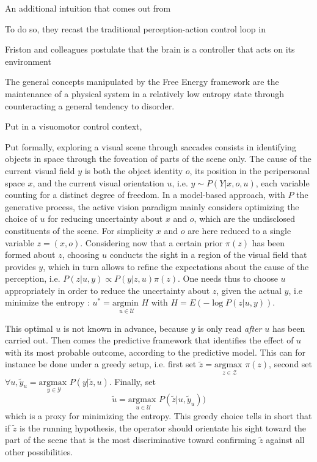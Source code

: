 \documentclass[12pt,twoside,openright]{article}
\begin{document}
	{\color{blue}
		
		
		An additional intuition that comes out from
		
		To do so, they recast the traditional perception-action control loop in  		 
	
		
		
		Friston and colleagues postulate that the brain is a controller that acts on its environment 
		
		The general concepts manipulated by the Free Energy framework are the maintenance of a physical system in a relatively low entropy state through counteracting a general tendency to disorder. 
		
		Put in a visuomotor control context, 
		
	}
	
	Put formally, exploring a visual scene through saccades consists in identifying objects in space through the foveation of parts of the scene only. The cause of the current visual field $y$ is both the object identity $o$, its position in the peripersonal space $x$, and the current visual orientation $u$, i.e. $y \sim P(Y|x,o,u)$, each variable counting for a distinct degree of freedom. %
	In a model-based approach, with $P$ the generative process, the active vision paradigm mainly considers optimizing the choice of $u$ for reducing uncertainty about $x$ and $o$, which are the undisclosed constituents of the scene. For simplicity $x$ and $o$ are here reduced to a single variable $z = (x, o)$. Considering now that a certain prior $\pi(z)$ has been formed about $z$, choosing  $u$ conducts the sight in a region of the visual field that provides $y$, which in turn allows to refine the expectations about the cause of the perception, i.e.
	$ P(z|u,y) \propto P(y|z,u) \pi(z)$. 
	One needs thus to choose $u$ appropriately in order to reduce the uncertainty about $z$, given the actual $y$, i.e minimize the entropy :
	$u^* = \underset{u \in \mathcal{U}}{\text{argmin }} H$ with $H = E(-\log P(z|u,y))$.
	
	This optimal $u$ is not known in advance, because $y$ is only read \emph{after} $u$ has been carried out. Then comes the predictive framework that identifies the effect of $u$ with its most probable outcome, according to the predictive model. This can for instance be done under a greedy setup, i.e. first set $\tilde{z} = \underset{z \in \mathcal{Z}}{\text{argmax }} \pi(z)$, second set $\forall u, \tilde{y}_u = \underset{y \in \mathcal{Y}}{\text{argmax }} P(y|\tilde{z},u)$.
	Finally, set 
	\begin{equation}
	\tilde{u} = \underset{u \in \mathcal{U}}{\text{argmax }}  P(\tilde{z}|u,\tilde{y}_u))
	\end{equation} which is a proxy for minimizing the entropy. This greedy choice tells in short that if $\tilde{z}$ is the running hypothesis, the operator should orientate his sight toward 
	the part of the scene that is the most discriminative toward confirming $\tilde{z}$ against all other possibilities. 
	
\end{document}
